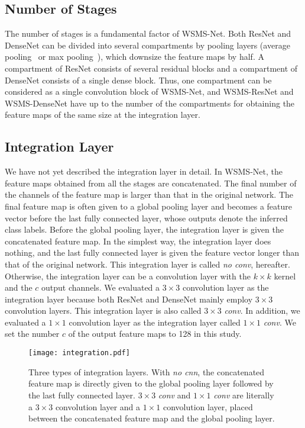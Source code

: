 \documentclass[journal]{IEEEtran}
\begin{document}
\subsection{Number of Stages}

The number of stages is a fundamental factor of WSMS-Net.
Both ResNet and DenseNet can be divided into several compartments by pooling layers (average pooling~\cite{LeCun1989} or max pooling~\cite{Riesenhuber1999}), which downsize the feature maps by half.
A compartment of ResNet consists of several residual blocks and a compartment of DenseNet consists of a single dense block.
Thus, one compartment can be considered as a single convolution block of WSMS-Net, and  WSMS-ResNet and WSMS-DenseNet have up to the number of the compartments for obtaining the feature maps of the same size at the integration layer.

\subsection{Integration Layer}

We have not yet described the integration layer in detail.
In WSMS-Net, the feature maps obtained from all the stages are concatenated.
The final number of the channels of the feature map is larger than that in the original network.
The final feature map is often given to a global pooling layer and becomes a feature vector before the last fully connected layer, whose outputs denote the inferred class labels.
Before the global pooling layer, the integration layer is given the concatenated feature map.
In the simplest way, the integration layer does nothing, and the last fully connected layer is given the feature vector longer than that of the original network.
This integration layer is called \emph{no conv}, hereafter.
Otherwise, the integration layer can be a convolution layer with the $k\times k$ kernel and the $c$ output channels.
We evaluated a $3\times 3$ convolution layer as the integration layer because both ResNet and DenseNet mainly employ $3\times 3$ convolution layers.
This integration layer is also called $3\times 3$ \emph{conv}.
In addition, we evaluated a $1\times 1$ convolution layer as the integration layer called $1\times 1$ \emph{conv}.
We set the number $c$ of the output feature maps to 128 in this study.



\begin{figure}[!t]
\centering
\texttt{[image: integration.pdf]}
\caption{Three types of integration layers.
With \emph{no cnn}, the concatenated feature map is directly given to the global pooling layer followed by the last fully connected layer.
$3\times3$ \emph{conv} and $1\times1$ \emph{conv} are literally a $3\times3$ convolution layer and a $1\times1$ convolution layer, placed between the concatenated feature map and the global pooling layer.
}
\label{fig:Integration}
\end{figure}
\end{document}
